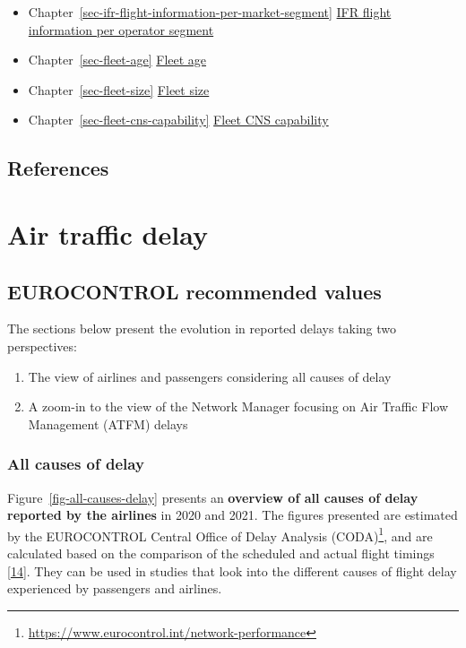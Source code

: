 \documentclass[
  11pt,
  a4paper,
]{book}
\providecommand{\tightlist}{%
  \setlength{\itemsep}{0pt}\setlength{\parskip}{0pt}}\usepackage{longtable,booktabs,array}
\DeclareRobustCommand{\href}[2]{#2\footnote{\url{#1}}}
\begin{document}
\begin{itemize}
\tightlist
\item
  Chapter~\ref{sec-ifr-flight-information-per-market-segment}
  \protect\hyperlink{sec-ifr-flight-information-per-market-segment}{IFR
  flight information per operator segment}
\item
  Chapter~\ref{sec-fleet-age} \protect\hyperlink{sec-fleet-age}{Fleet
  age}
\item
  Chapter~\ref{sec-fleet-size} \protect\hyperlink{sec-fleet-size}{Fleet
  size}
\item
  Chapter~\ref{sec-fleet-cns-capability}
  \protect\hyperlink{sec-fleet-cns-capability}{Fleet CNS capability}
\end{itemize}

\hypertarget{references-3}{%
\section{References}\label{references-3}}

\hypertarget{sec-air-traffic-delay}{%
\chapter{Air traffic delay}\label{sec-air-traffic-delay}}

\hypertarget{eurocontrol-recommended-values-1}{%
\section{EUROCONTROL recommended
values}\label{eurocontrol-recommended-values-1}}

The sections below present the evolution in reported delays taking two
perspectives:

\begin{enumerate}
\def\labelenumi{\arabic{enumi}.}
\item
  The view of airlines and passengers considering all causes of delay
\item
  A zoom-in to the view of the Network Manager focusing on Air Traffic
  Flow Management (ATFM) delays
\end{enumerate}

\hypertarget{all-causes-of-delay}{%
\subsection{All causes of delay}\label{all-causes-of-delay}}

Figure~\ref{fig-all-causes-delay} presents an \textbf{overview of all
causes of delay reported by the airlines} in 2020 and 2021. The figures
presented are estimated by the EUROCONTROL
\href{https://www.eurocontrol.int/network-performance}{Central Office of
Delay Analysis (CODA)}, and are calculated based on the comparison of
the scheduled and actual flight timings
\protect\hyperlink{ref-coda2021}{{[}14{]}}. They can be used in studies
that look into the different causes of flight delay experienced by
passengers and airlines.
\end{document}
